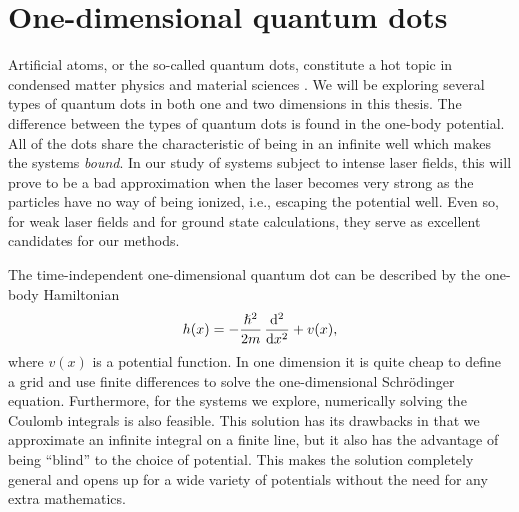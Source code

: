 \section{One-dimensional quantum dots}
    \label{sec:one-dim-qd}
    Artificial atoms, or the so-called quantum dots, constitute a hot topic in
    condensed matter physics and material sciences \cite{hjorth2017advanced,
    lohne, fei, anisimovas1998energy}.
    We will be exploring several types of quantum dots in both one and two
    dimensions in this thesis.
    The difference between the types of quantum dots is found in the
    one-body potential.
    All of the dots share the characteristic of being in an infinite well which
    makes the systems \emph{bound}.
    In our study of systems subject to intense laser fields, this will prove to
    be a bad approximation when the laser becomes very strong as the particles
    have no way of being ionized, i.e., escaping the potential well.
    Even so, for weak laser fields and for ground state calculations, they serve
    as excellent candidates for our methods.

    The time-independent one-dimensional quantum dot can be described by the
    one-body Hamiltonian
    \begin{align}
        \oneten(x)
        = -\frac{\hslash^2}{2m} \dod[2]{}{x}
        + v(x),
        \label{eq:one-body-odqd}
    \end{align}
    where $v(x)$ is a potential function.
    In one dimension it is quite cheap to define a grid and use finite
    differences to solve the one-dimensional Schrödinger equation.
    Furthermore, for the systems we explore, numerically solving the Coulomb
    integrals is also feasible.
    This solution has its drawbacks in that we approximate an infinite integral
    on a finite line, but it also has the advantage of being ``blind'' to the
    choice of potential.
    This makes the solution completely general and opens up for a wide variety
    of potentials without the need for any extra mathematics.


